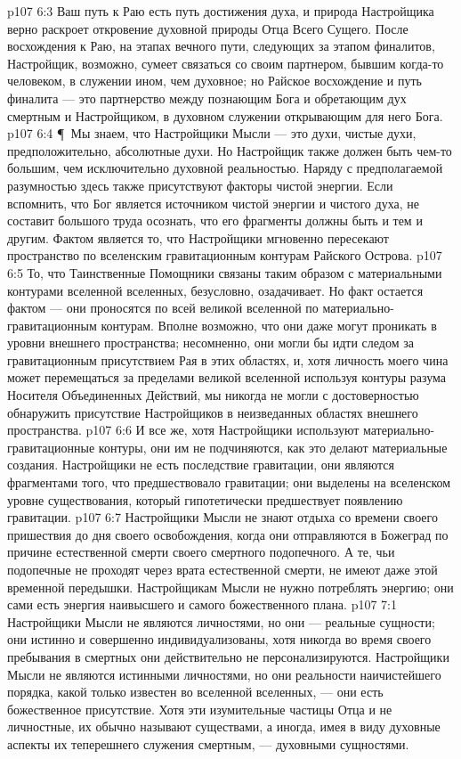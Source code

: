 \vs p107 6:3 Ваш путь к Раю есть путь достижения духа, и природа Настройщика верно раскроет откровение духовной природы Отца Всего Сущего. После восхождения к Раю, на этапах вечного пути, следующих за этапом финалитов, Настройщик, возможно, сумеет связаться со своим партнером, бывшим когда\hyp{}то человеком, в служении ином, чем духовное; но Райское восхождение и путь финалита --- это партнерство между познающим Бога и обретающим дух смертным и Настройщиком, в духовном служении открывающим для него Бога.
\vs p107 6:4 \P\ Мы знаем, что Настройщики Мысли --- это духи, чистые духи, предположительно, абсолютные духи. Но Настройщик также должен быть чем\hyp{}то большим, чем исключительно духовной реальностью. Наряду с предполагаемой разумностью здесь также присутствуют факторы чистой энергии. Если вспомнить, что Бог является источником чистой энергии и чистого духа, не составит большого труда осознать, что его фрагменты должны быть и тем и другим. Фактом является то, что Настройщики мгновенно пересекают пространство по вселенским гравитационным контурам Райского Острова.
\vs p107 6:5 То, что Таинственные Помощники связаны таким образом с материальными контурами вселенной вселенных, безусловно, озадачивает. Но факт остается фактом --- они проносятся по всей великой вселенной по материально\hyp{}гравитационным контурам. Вполне возможно, что они даже могут проникать в уровни внешнего пространства; несомненно, они могли бы идти следом за гравитационным присутствием Рая в этих областях, и, хотя личность моего чина может перемещаться за пределами великой вселенной используя контуры разума Носителя Объединенных Действий, мы никогда не могли с достоверностью обнаружить присутствие Настройщиков в неизведанных областях внешнего пространства.
\vs p107 6:6 И все же, хотя Настройщики используют материально\hyp{}гравитационные контуры, они им не подчиняются, как это делают материальные создания. Настройщики не есть последствие гравитации, они являются фрагментами того, что предшествовало гравитации; они выделены на вселенском уровне существования, который гипотетически предшествует появлению гравитации.
\vs p107 6:7 Настройщики Мысли не знают отдыха со времени своего пришествия до дня своего освобождения, когда они отправляются в Божеград по причине естественной смерти своего смертного подопечного. А те, чьи подопечные не проходят через врата естественной смерти, не имеют даже этой временной передышки. Настройщикам Мысли не нужно потреблять энергию; они сами есть энергия наивысшего и самого божественного плана.
\vs p107 7:1 Настройщики Мысли не являются личностями, но они --- реальные сущности; они истинно и совершенно индивидуализованы, хотя никогда во время своего пребывания в смертных они действительно не персонализируются. Настройщики Мысли не являются истинными личностями, но они  реальности наичистейшего порядка, какой только известен во вселенной вселенных, --- они есть божественное присутствие. Хотя эти изумительные частицы Отца и не личностные, их обычно называют существами, а иногда, имея в виду духовные аспекты их теперешнего служения смертным, --- духовными сущностями.
